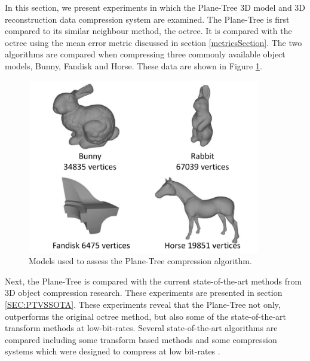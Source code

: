 
In this section, we present experiments in which the Plane-Tree 3D model and 3D reconstruction data compression system are examined. The Plane-Tree is first compared to its similar neighbour method, the octree. It is compared with the octree using the mean error metric discussed in section \ref{metricsSection}. The two algorithms are compared when compressing three commonly available object models, Bunny, Fandisk and Horse. These data are shown in Figure \ref{fig:MODELSUSEDA}. \\

\begin{figure}[!htb]
\centering
\includegraphics[width=4.0in]{images/experiments/test_data/modelsused}
\caption{Models used to assess the Plane-Tree compression algorithm.}
\label{fig:MODELSUSEDA}
\end{figure}


Next, the Plane-Tree is compared with the current state-of-the-art methods from 3D object compression research. These experiments are presented in section \ref{SEC:PTVSSOTA}. These experiments reveal that the Plane-Tree not only, outperforms the original octree method, but also some of the state-of-the-art transform methods at low-bit-rates. Several state-of-the-art algorithms are compared including some transform based methods \cite{Bayazit103DMesh,Khodakovsky00Progressive} and some compression systems which were designed to compress at low bit-rates \cite{Peng10Feature,Lincoln13Hons}. \\ 

